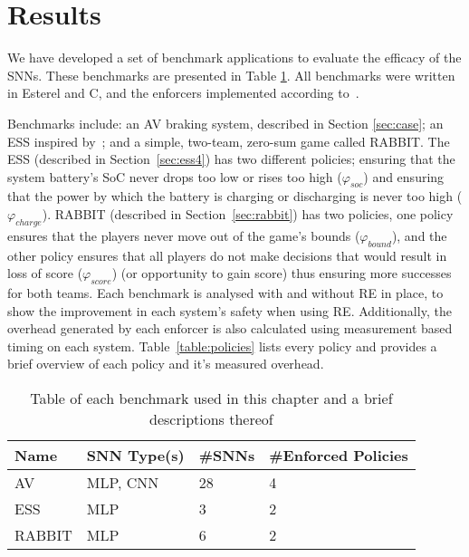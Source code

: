 
\section{Results}
\label{sec:resultsc4}

We have developed a set of benchmark applications to evaluate the efficacy of the \acp{SNN}.
These benchmarks are presented in Table \ref{table:benchmarks4}.
All benchmarks were written in Esterel and C, and the enforcers implemented according to~\cite{recps}.

Benchmarks include: an \acf{AV} braking system, described in Section \ref{sec:case}; an \acf{ESS} inspired by~\cite{chaudhari2017hybrid}; and a simple, two-team, zero-sum game called RABBIT.
The \ac{ESS} (described in Section~\ref{sec:ess4}) has two different policies; ensuring that the system battery's \ac{SoC} never drops too low or rises too high  ($\varphi_{soc}$) and ensuring that the power by which the battery is charging or discharging is never too high ($\varphi_{charge}$).
RABBIT (described in Section~\ref{sec:rabbit}) has two policies, one policy ensures that the players never move out of the game's bounds ($\varphi_{bound}$), and the other policy ensures that all players do not make decisions that would result in loss of score ($\varphi_{score}$) (or opportunity to gain score) thus ensuring more successes for both teams.
Each benchmark is analysed with and without \ac{RE} in place, to show the improvement in each system's safety when using \ac{RE}.
Additionally, the overhead generated by each enforcer is also calculated using measurement based timing on each system. 
Table~\ref{table:policies} lists every policy and provides a brief overview of each policy and it's measured overhead. 

\begin{table}[H]
	\centering
	\caption{Table of each benchmark used in this chapter and a brief descriptions thereof}
	\label{table:benchmarks4}
	\begin{tabular}{@{}|l|l|l|l|@{}}
		\hline
		Name & \ac{SNN} Type(s) & \#\acp{SNN} & \#Enforced Policies \\ \hline
		\acs{AV} & \ac{MLP}, \ac{CNN}  & 28 & 4 \\
		\acs{ESS} & \ac{MLP} & 3 & 2 \\
		RABBIT & \ac{MLP}  & 6 & 2 \\
		\hline
	\end{tabular}
\end{table}

